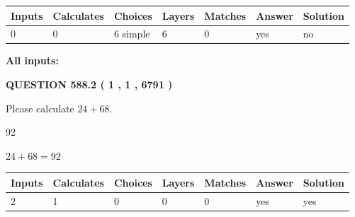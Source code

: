 \documentclass[12pt]{article}
\begin{document}
 
\noindent{}
 
 
   
   
   
   
\noindent\begin{tabular}{|l|l|l|l|l|l|l|}
 \hline
Inputs & Calculates & Choices & Layers & Matches & Answer & Solution \\ \hline
 0  & 
 0  & 
 6
  simple  
  & 
 6  & 
 0  & 
  yes & 
  no 
  \\ \hline
 \end{tabular}
   
   
   
   
\noindent{}
   
   
   
   
\noindent\vspace{0.1in}\hspace{-0.08in} {\textbf{\Large{All inputs: }}}
   
   
  
\vspace{0.2in}
  
{\textbf{\Large{QUESTION
588.2 
 ( 1 , 1 , 6791 )
}}}
  
  
 
Please calculate $ %
24 +  %
68 $.
 
 
 
\noindent{}
 
 

92
 
 
\noindent{}
 
 

 
 
 
\noindent{}
 
 

$ %
24 +  %
68=   %
92$
 
 
\noindent{}
 
 

 
   
   
   
   
\noindent\begin{tabular}{|l|l|l|l|l|l|l|}
 \hline
Inputs & Calculates & Choices & Layers & Matches & Answer & Solution \\ \hline
 2  & 
 1  & 
 0
  & 
 0  & 
 0  & 
  yes & 
  yes 
  \\ \hline
 \end{tabular}
   
\end{document}
